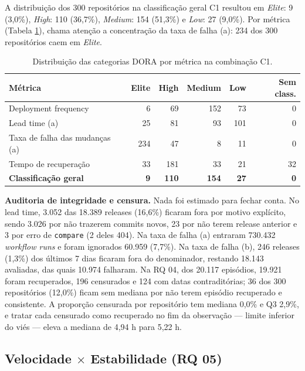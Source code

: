 A distribuição dos 300 repositórios na classificação geral C1 resultou em \emph{Elite}: 9
(3,0\%), \emph{High}: 110 (36,7\%), \emph{Medium}: 154 (51,3\%) e \emph{Low}: 27 (9,0\%). Por
métrica (Tabela \ref{tab:c1}), chama atenção a concentração da taxa de falha (a): 234 dos 300
repositórios caem em \emph{Elite}.

\begin{table}[ht]
\centering
\caption{Distribuição das categorias DORA por métrica na combinação C1.}
\label{tab:c1}
\footnotesize
\begin{tabular}{lrrrrr}
\toprule
\textbf{Métrica} & \textbf{Elite} & \textbf{High} & \textbf{Medium} & \textbf{Low} &
\textbf{Sem class.} \\
\midrule
Deployment frequency & 6 & 69 & 152 & 73 & 0 \\
Lead time (a) & 25 & 81 & 93 & 101 & 0 \\
Taxa de falha das mudanças (a) & 234 & 47 & 8 & 11 & 0 \\
Tempo de recuperação & 33 & 181 & 33 & 21 & 32 \\
\midrule
\textbf{Classificação geral} & \textbf{9} & \textbf{110} & \textbf{154} & \textbf{27} & \textbf{0} \\
\bottomrule
\end{tabular}
\end{table}

\textbf{Auditoria de integridade e censura.} Nada foi estimado para fechar conta. No lead
time, 3.052 das 18.389 releases (16,6\%) ficaram fora por motivo explícito, sendo 3.026 por
não trazerem commits novos, 23 por não terem release anterior e 3 por erro de
\texttt{compare} (2 deles 404). Na taxa de falha (a) entraram 730.432 \emph{workflow runs} e foram
ignorados 60.959 (7,7\%). Na taxa de falha (b), 246 releases (1,3\%) dos últimos 7 dias ficaram fora do
denominador, restando 18.143 avaliadas, das quais 10.974 falharam. Na RQ 04, dos 20.117
episódios, 19.921 foram recuperados, 196 censurados e 124 com datas contraditórias; 36 dos
300 repositórios (12,0\%) ficam sem mediana por não terem episódio recuperado e consistente.
A proporção censurada por repositório tem mediana 0,0\% e Q3 2,9\%, e tratar cada censurado
como recuperado no fim da observação --- limite inferior do viés --- eleva a mediana de
4,94 h para 5,22 h.

\subsection{Velocidade $\times$ Estabilidade (RQ 05)}

